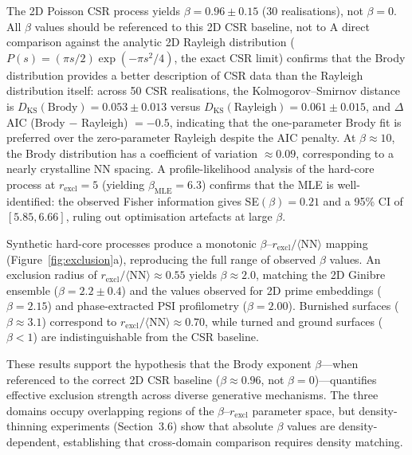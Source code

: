 \documentclass[final,3p,times,twocolumn]{elsarticle}
\theoremstyle{definition}
\begin{document}
The 2D Poisson CSR process yields $\beta = 0.96 \pm 0.15$
(30 realisations), not $\beta = 0$. All $\beta$
values should be referenced to this 2D CSR baseline, not to
A direct comparison against the analytic 2D Rayleigh distribution
($P(s) = (\pi s/2)\exp(-\pi s^2/4)$, the exact CSR limit) confirms
that the Brody distribution provides a better description of CSR
data than the Rayleigh distribution itself: across 50 CSR
realisations, the Kolmogorov--Smirnov distance is
$D_{\text{KS}}(\text{Brody}) = 0.053 \pm 0.013$ versus
$D_{\text{KS}}(\text{Rayleigh}) = 0.061 \pm 0.015$, and $\Delta$AIC
(Brody $-$ Rayleigh) $= -0.5$, indicating that the one-parameter Brody
fit is preferred over the zero-parameter Rayleigh despite the AIC
penalty. At $\beta \approx 10$, the Brody distribution has a
coefficient of variation $\approx 0.09$, corresponding to a nearly
crystalline NN spacing. A profile-likelihood analysis of the
hard-core process at $r_{\text{excl}} = 5$ (yielding $\beta_{\text{MLE}}
= 6.3$) confirms that the MLE is well-identified: the observed Fisher
information gives SE$(\beta) = 0.21$ and a 95\% CI of $[5.85, 6.66]$,
ruling out optimisation artefacts at large $\beta$.

Synthetic hard-core processes produce a monotonic
$\beta$--$r_{\text{excl}}/\langle\text{NN}\rangle$ mapping
(Figure~\ref{fig:exclusion}a), reproducing the full range of
observed $\beta$ values. An exclusion radius of
$r_{\text{excl}}/\langle\text{NN}\rangle \approx 0.55$ yields
$\beta \approx 2.0$, matching the 2D Ginibre ensemble
($\beta = 2.2 \pm 0.4$) and the values observed for 2D prime
embeddings ($\beta = 2.15$) and phase-extracted PSI
profilometry ($\beta = 2.00$). Burnished surfaces
($\beta \approx 3.1$) correspond to
$r_{\text{excl}}/\langle\text{NN}\rangle \approx 0.70$, while
turned and ground surfaces ($\beta < 1$) are
indistinguishable from the CSR baseline.

These results support the hypothesis that the Brody exponent
$\beta$---when referenced to the correct 2D CSR baseline
($\beta \approx 0.96$, not $\beta = 0$)---quantifies effective
exclusion strength across diverse generative mechanisms.
The three domains occupy overlapping regions of the
$\beta$--$r_{\text{excl}}$ parameter space, but
density-thinning experiments (Section~3.6) show that absolute
$\beta$ values are density-dependent, establishing that
cross-domain comparison requires density matching.
\end{document}
